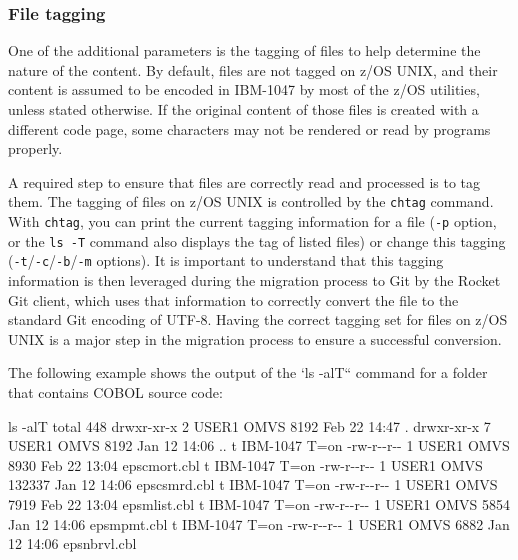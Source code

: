 \documentclass[
  letterpaper,
  DIV=11,
  numbers=noendperiod]{scrartcl}
\newenvironment{Shaded}{\begin{snugshade}}{\end{snugshade}}
\newcommand{\NormalTok}[1]{\textcolor[rgb]{0.00,0.23,0.31}{#1}}
\begin{document}
\hypertarget{file-tagging}{%
\subsubsection{File tagging}\label{file-tagging}}

One of the additional parameters is the tagging of files to help
determine the nature of the content. By default, files are not tagged on
z/OS UNIX, and their content is assumed to be encoded in IBM-1047 by
most of the z/OS utilities, unless stated otherwise. If the original
content of those files is created with a different code page, some
characters may not be rendered or read by programs properly.

A required step to ensure that files are correctly read and processed is
to tag them. The tagging of files on z/OS UNIX is controlled by the
\texttt{chtag} command. With \texttt{chtag}, you can print the current
tagging information for a file (\texttt{-p} option, or the
\texttt{ls\ -T} command also displays the tag of listed files) or change
this tagging (\texttt{-t}/\texttt{-c}/\texttt{-b}/\texttt{-m} options).
It is important to understand that this tagging information is then
leveraged during the migration process to Git by the Rocket Git client,
which uses that information to correctly convert the file to the
standard Git encoding of UTF-8. Having the correct tagging set for files
on z/OS UNIX is a major step in the migration process to ensure a
successful conversion.

The following example shows the output of the `ls -alT`` command for a
folder that contains COBOL source code:

\begin{Shaded}
\begin{Highlighting}[]
\NormalTok{ls {-}alT}
\NormalTok{total 448}
\NormalTok{                    drwxr{-}xr{-}x   2 USER1    OMVS        8192 Feb 22 14:47 .}
\NormalTok{                    drwxr{-}xr{-}x   7 USER1    OMVS        8192 Jan 12 14:06 ..}
\NormalTok{t IBM{-}1047    T=on  {-}rw{-}r{-}{-}r{-}{-}   1 USER1    OMVS        8930 Feb 22 13:04 epscmort.cbl}
\NormalTok{t IBM{-}1047    T=on  {-}rw{-}r{-}{-}r{-}{-}   1 USER1    OMVS      132337 Jan 12 14:06 epscsmrd.cbl}
\NormalTok{t IBM{-}1047    T=on  {-}rw{-}r{-}{-}r{-}{-}   1 USER1    OMVS        7919 Feb 22 13:04 epsmlist.cbl}
\NormalTok{t IBM{-}1047    T=on  {-}rw{-}r{-}{-}r{-}{-}   1 USER1    OMVS        5854 Jan 12 14:06 epsmpmt.cbl}
\NormalTok{t IBM{-}1047    T=on  {-}rw{-}r{-}{-}r{-}{-}   1 USER1    OMVS        6882 Jan 12 14:06 epsnbrvl.cbl}
\end{Highlighting}
\end{Shaded}
\end{document}
